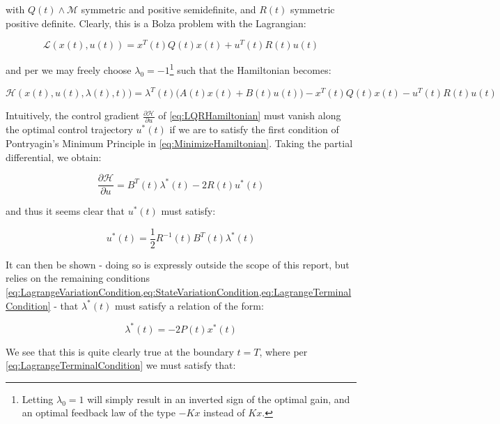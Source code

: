 with $Q(t) \wedge \mathcal{M}$ symmetric and positive semidefinite, and $R(t)$ symmetric positive definite. Clearly, this is a Bolza problem with the Lagrangian:

\begin{equation}\label{eq:LQRLagrangian}
\mathcal{L}(x(t),u(t)) = x^T(t)Q(t)x(t) + u^T(t)R(t)u(t)
\end{equation}

and per \cite{Liberzon2012} we may freely choose $\lambda_0 = -1$\footnote{Letting $\lambda_0 = 1$ will simply result in an inverted sign of the optimal gain, and an optimal feedback law of the type $-Kx$ instead of $Kx$.} such that the Hamiltonian becomes:

\begin{equation}\label{eq:LQRHamiltonian}
	\mathcal{H}(x(t),u(t),\lambda(t),t)) = \lambda^T(t)\big(A(t)x(t) + B(t)u(t)\big) - x^T(t)Q(t)x(t) - u^T(t)R(t)u(t)
\end{equation}

Intuitively, the control gradient $\frac{\partial \mathcal{H}}{\partial u}$ of \cref{eq:LQRHamiltonian} must vanish along the optimal control trajectory $u^*(t)$ if we are to satisfy the first condition of Pontryagin's Minimum Principle in \cref{eq:MinimizeHamiltonian}. Taking the partial differential, we obtain:

\begin{equation}\label{eq:HamiltonianUGradient}
 \frac{\partial \mathcal{H}}{\partial u} = B^T(t)\lambda^*(t) - 2R(t)u^*(t)
\end{equation}

and thus it seems clear that $u^*(t)$ must satisfy:

\begin{equation}\label{eq:OptimalControlSequence}
	u^*(t) = \frac{1}{2} R^{-1}(t)B^T(t)\lambda^*(t)
\end{equation}

It can then be shown - doing so is expressly outside the scope of this report, but relies on the remaining conditions \cref{eq:LagrangeVariationCondition,eq:StateVariationCondition,eq:LagrangeTerminalCondition} - that $\lambda^*(t)$ must satisfy a relation of the form:

\begin{equation}\label{eq:OptimalCostateSequence}
	\lambda^*(t) = -2P(t)x^*(t)
\end{equation}

We see that this is quite clearly true at the boundary $t = T$, where per \cref{eq:LagrangeTerminalCondition} we must satisfy that:

